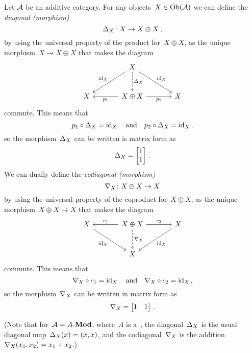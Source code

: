 \begin{remark}
  \label{sum via category structure}
  Let$~\mathcal{A}$ be an additive category.
  For any objects~$X \in \operatorname{Ob}(\mathcal{A})$ we can define the \emph{diagonal \textup(morphism\textup)}
  \[
            \Delta_X
    \colon  X
    \to     X \oplus X \,,
  \]
  by using the universal property of the product for~$X \oplus X$, as the unique morphism~$X \to X \oplus X$ that makes the diagram
  \[
    \begin{tikzcd}[sep = large]
        {}
      & X
        \arrow[dashed]{d}[right]{\diag_X}
        \arrow{dl}[above left]{\id_X}
        \arrow{dr}[above right]{\id_X}
      & {}
      \\
        X
      & X \oplus X
        \arrow{l}[below]{p_1}
        \arrow{r}[below]{p_2}
      & X
    \end{tikzcd}
  \]
  commute.
  This means that
  \[
    p_1 \circ \Delta_X = \operatorname{id}_X
    \quad\text{and}\quad
    p_2 \circ \Delta_X = \operatorname{id}_X \,,
  \]
  so the morphism~$\Delta_X$ can be written is matrix form as
  \[
      \Delta_X
    = \begin{bmatrix}
        1 \\ 1
      \end{bmatrix} \,.
  \]
  We can dually define the \emph{codiagonal \textup(morphism\textup)}
  \[
            \nabla_X
    \colon  X \oplus X
    \to     X
  \]
  by using the universal property of the coproduct for~$X \oplus X$, as the unique morphism~$X \oplus X \to X$ that makes the diagram
  \[
    \begin{tikzcd}[sep = large]
        X
        \arrow{dr}[below left]{\id_X}
      & X \oplus X
        \arrow[dashed]{d}[right]{\codiag_X}
        \arrow{l}[above]{c_1}
        \arrow{r}[above]{c_2}
      & X
        \arrow{dl}[below right]{\id_X}
      \\
        {}
      & X
      & {}
    \end{tikzcd}
  \]
  commute.
  This means that
  \[
    \nabla_X \circ c_1 = \operatorname{id}_X
    \quad\text{and}\quad
    \nabla_X \circ c_2 = \operatorname{id}_X \,,
  \]
  so the morphism~$\nabla_X$ can be written in matrix form as
  \[
      \nabla_X
    = \begin{bmatrix}
        1 & 1
      \end{bmatrix} \,.
  \]
  
  (Note that for~$\mathcal{A} = \text{$A$-$\mathbf{Mod}$}$, where~$A$ is a~{\kalg}, the diagonal~$\Delta_X$ is the usual diagonal map~$\Delta_X(x) = (x,x)$, and the codiagonal~$\nabla_X$ is the addition~$\nabla_X(x_1, x_2) = x_1 + x_2$.)
  

\end{remark}
